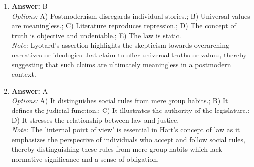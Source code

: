 \documentclass[12pt]{article}
\begin{document}
\begin{enumerate}[label=\arabic*.]
\item \textbf{Answer:} B
\\ \textit{Options:} A) Postmodernism disregards individual stories.; B) Universal values are meaningless.; C) Literature reproduces repression.; D) The concept of truth is objective and undeniable.; E) The law is static.
\\ \textit{Note:} Lyotard's assertion highlights the skepticism towards overarching narratives or ideologies that claim to offer universal truths or values, thereby suggesting that such claims are ultimately meaningless in a postmodern context.
\item \textbf{Answer:} A
\\ \textit{Options:} A) It distinguishes social rules from mere group habits.; B) It defines the judicial function.; C) It illustrates the authority of the legislature.; D) It stresses the relationship between law and justice.
\\ \textit{Note:} The 'internal point of view' is essential in Hart's concept of law as it emphasizes the perspective of individuals who accept and follow social rules, thereby distinguishing these rules from mere group habits which lack normative significance and a sense of obligation.
\end{enumerate}
\end{document}

